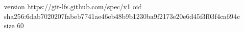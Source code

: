 version https://git-lfs.github.com/spec/v1
oid sha256:6dab7020207fabeb7741ae46eb48b9b1230ba9f2173e20e6d45f3f03f4ca694c
size 60
